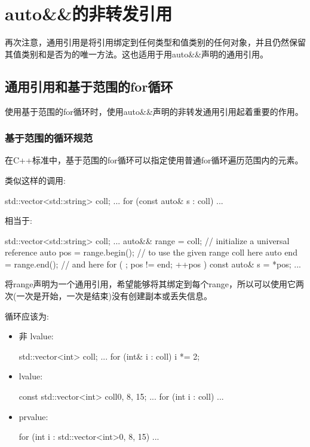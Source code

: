 \section{auto\&\&的非转发引用}
再次注意，通用引用是将引用绑定到任何类型和值类别的任何对象，并且仍然保留其值类别和是否为的唯一方法。这也适用于用auto\&\&声明的通用引用。

\subsection{通用引用和基于范围的for循环}

使用基于范围的for循环时，使用auto\&\&声明的非转发通用引用起着重要的作用。

\subsubsection{基于范围的循环规范}

在C++标准中，基于范围的for循环可以指定使用普通for循环遍历范围内的元素。

类似这样的调用:

\begin{cppcode}
std::vector<std::string> coll;
...
for (const auto& s : coll) {
	...
}
\end{cppcode}

相当于:

\begin{cppcode}
std::vector<std::string> coll;
...
auto&& range = coll; // initialize a universal reference
auto pos = range.begin(); // to use the given range coll here
auto end = range.end(); // and here
for ( ; pos != end; ++pos ) {
	const auto& s = *pos;
	...
}
\end{cppcode}

将range声明为一个通用引用，希望能够将其绑定到每个range，所以可以使用它两次(一次是开始，一次是结束)没有创建副本或丢失信息。

循环应该为:

\begin{itemize}
\item 非 lvalue:
\begin{cppcode}
std::vector<int> coll;
...
for (int& i : coll) {
	i *= 2;
}
\end{cppcode}
\item {} lvalue:
\begin{cppcode}
const std::vector<int> coll{0, 8, 15};
...
for (int i : coll) {
	...
}
\end{cppcode}
\item prvalue:
\begin{cppcode}
for (int i : std::vector<int>{0, 8, 15}) {
	...
}
\end{cppcode}
\end{itemize}

